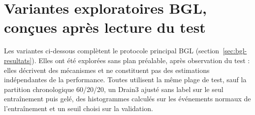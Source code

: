 \section{Variantes exploratoires BGL, conçues après lecture du test}
\label{sec:annexe-variantes-bgl}

Les variantes ci-dessous complètent le protocole principal BGL (section~\ref{sec:bgl-resultats}). Elles ont été explorées sans plan préalable, après observation du test : elles décrivent des mécanismes et ne constituent pas des estimations indépendantes de la performance. Toutes utilisent la même plage de test, sauf la partition chronologique 60/20/20, un Drain3 ajusté sans label sur le seul entraînement puis gelé, des histogrammes calculés sur les événements normaux de l'entraînement et un seuil choisi sur la validation.

\begin{table}[H]
\centering
\caption[BGL : variantes exploratoires.]{BGL : variantes exploratoires. Le seuil est choisi sur la validation, mais le choix des variantes dépend de l'observation du test. Source : campagnes BGL, second protocole et protocole contigu (tableau~\ref{tab:preuves-experimentales}).}
\label{tab:bgl-protocoles}
\small
{}
\end{table}

